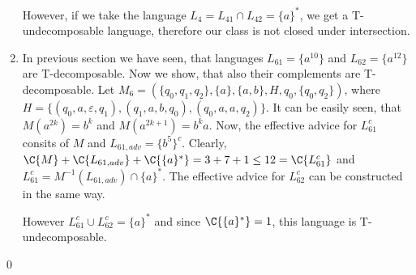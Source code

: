 \begin{enumerate}
However, if we take the language $L_4 = L_{41} \cap L_{42} = \{ a\}^*$, we get a T-undecomposable language, therefore our class is not closed under intersection.

\item In previous section we have seen, that languages $L_{61} = \{a^{10}\}$ and $L_{62}=\{a^{12}\}$ are T-decomposable. Now we show, that also their complements are T-decomposable. Let $M_6 =(\{q_0,q_1,q_2\}, \{a\},\{a,b\},H,q_0,\{q_0,q_2\})$, where $H = \{(q_0,a,\varepsilon,q_1),\allowbreak (q_1,a,b,q_0),\allowbreak (q_0,a,a,q_2)\}$. It can be easily seen, that $M(a^{2k}) = b^k$ and $M(a^{2k+1}) = b^ka$. Now, the effective advice for $L_{61}^c$ consits of $M$ and $L_{61,adv} = \{b^5\}^c$. Clearly, $\C{M} + \C{L_{61,adv}} + \C{\{a\}^*} = 3+7+1 \leq 12 = \C{L_{61}^c}$ and $L_{61}^c = M^{-1}(L_{61,adv}) \cap \{a\}^*$. The effective advice for $L_{62}^c$ can be constructed in the same way.

However $L_{61}^c \cup L_{62}^c = \{a\}^*$ and since $\C{\{a\}^*} = 1$, this language is T-undecomposable.
\end{enumerate} \qed
